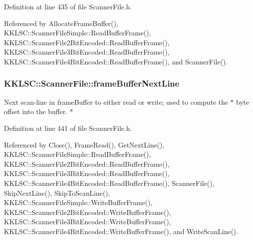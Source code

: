 Definition at line 435 of file Scanner\+File.\+h.



Referenced by Allocate\+Frame\+Buffer(), K\+K\+L\+S\+C\+::\+Scanner\+File\+Simple\+::\+Read\+Buffer\+Frame(), K\+K\+L\+S\+C\+::\+Scanner\+File2\+Bit\+Encoded\+::\+Read\+Buffer\+Frame(), K\+K\+L\+S\+C\+::\+Scanner\+File3\+Bit\+Encoded\+::\+Read\+Buffer\+Frame(), K\+K\+L\+S\+C\+::\+Scanner\+File4\+Bit\+Encoded\+::\+Read\+Buffer\+Frame(), and Scanner\+File().

\subsubsection[{\texorpdfstring{frame\+Buffer\+Next\+Line}{frameBufferNextLine}}]{ K\+K\+L\+S\+C\+::\+Scanner\+File\+::frame\+Buffer\+Next\+Line\hspace{0.3cm}{\ttfamily [protected]}}\hypertarget{class_k_k_l_s_c_1_1_scanner_file_a04ad19b685d3d4cd26ddc81a7e0f5d76}{}\label{class_k_k_l_s_c_1_1_scanner_file_a04ad19b685d3d4cd26ddc81a7e0f5d76}
Next scan-\/line in \textquotesingle{}frame\+Buffer\textquotesingle{} to either read or write; used to compute the $\ast$ byte offset into the buffer. $\ast$ 

Definition at line 441 of file Scanner\+File.\+h.



Referenced by Close(), Frame\+Read(), Get\+Next\+Line(), K\+K\+L\+S\+C\+::\+Scanner\+File\+Simple\+::\+Read\+Buffer\+Frame(), K\+K\+L\+S\+C\+::\+Scanner\+File2\+Bit\+Encoded\+::\+Read\+Buffer\+Frame(), K\+K\+L\+S\+C\+::\+Scanner\+File3\+Bit\+Encoded\+::\+Read\+Buffer\+Frame(), K\+K\+L\+S\+C\+::\+Scanner\+File4\+Bit\+Encoded\+::\+Read\+Buffer\+Frame(), Scanner\+File(), Skip\+Next\+Line(), Skip\+To\+Scan\+Line(), K\+K\+L\+S\+C\+::\+Scanner\+File\+Simple\+::\+Write\+Buffer\+Frame(), K\+K\+L\+S\+C\+::\+Scanner\+File2\+Bit\+Encoded\+::\+Write\+Buffer\+Frame(), K\+K\+L\+S\+C\+::\+Scanner\+File3\+Bit\+Encoded\+::\+Write\+Buffer\+Frame(), K\+K\+L\+S\+C\+::\+Scanner\+File4\+Bit\+Encoded\+::\+Write\+Buffer\+Frame(), and Write\+Scan\+Line().


